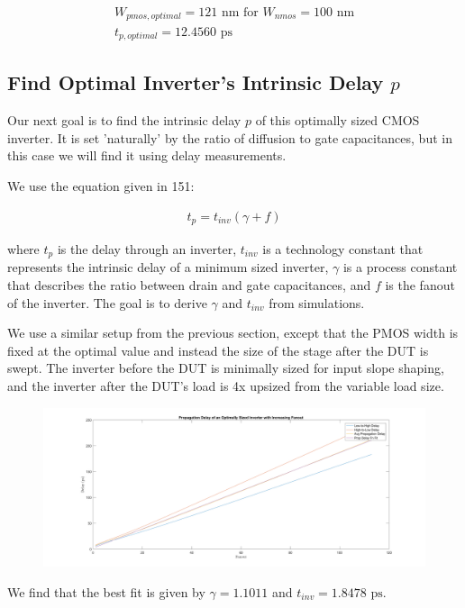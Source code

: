 \documentclass[11pt]{article}
\begin{document}
\begin{eqnarray}
	W_{pmos,optimal} = 121 \text{ nm for } W_{nmos} = 100 \text{ nm} \nonumber \\
	t_{p,optimal} = 12.4560 \text{ ps} \nonumber
\end{eqnarray}

\subsection{Find Optimal Inverter's Intrinsic Delay $p$}
Our next goal is to find the intrinsic delay $p$ of this optimally sized CMOS inverter. It is set 'naturally' by the ratio of diffusion to gate capacitances, but in this case we will find it using delay measurements.

We use the equation given in 151:

\begin{eqnarray}
	t_p = t_{inv} (\gamma + f) \nonumber
\end{eqnarray}

where $t_p$ is the delay through an inverter, $t_{inv}$ is a technology constant that represents the intrinsic delay of a minimum sized inverter, $\gamma$ is a process constant that describes the ratio between drain and gate capacitances, and $f$ is the fanout of the inverter. The goal is to derive $\gamma$ and $t_{inv}$ from simulations.

We use a similar setup from the previous section, except that the PMOS width is fixed at the optimal value and instead the size of the stage after the DUT is swept. The inverter before the DUT is minimally sized for input slope shaping, and the inverter after the DUT's load is 4x upsized from the variable load size.

\begin{figure}[H]
	\centerline{\includegraphics[width=\textwidth+2cm]{images/inverter_delay_vs_fanout.png}}
\end{figure}

We find that the best fit is given by $\gamma = 1.1011$ and $t_{inv} = 1.8478 \text{ ps}$.
\end{document}
